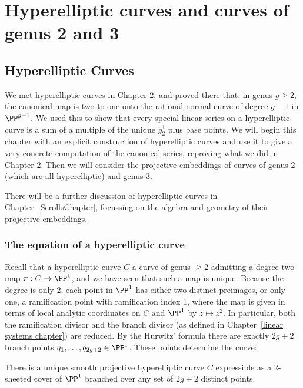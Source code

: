 

\chapter{Hyperelliptic curves and curves of genus 2 and 3}\label{genus 2 and 3 chapter}

\section{Hyperelliptic Curves}\label{hyperelliptic}
 
We met hyperelliptic curves in Chapter 2, and proved there that, in genus $g \geq 2$, the canonical
map is two to one onto the rational normal curve of degree $g-1$ in $\PP^{g-1}$. We used this to show that every special linear series on a hyperelliptic curve is a sum of a multiple of  the 
unique $g^1_2$ plus base points. We will begin this chapter with an explicit construction of hyperelliptic curves and use it to give a very concrete computation of the canonical series, reproving what we did in Chapter 2. Then we will consider the projective embeddings of curves of genus 2 (which are all hyperelliptic) and genus 3.
 
There will be a further discussion of hyperelliptic curves in Chapter~\ref{ScrollsChapter}, focussing on the algebra and geometry of their projective embeddings. 
  
 \subsection{The equation of a hyperelliptic curve}
 
Recall that a hyperelliptic curve $C$ a curve of genus $\geq 2$ admitting a degree two map $\pi : C \to \PP^1$, and we have seen that such a map is unique. Because the degree is only 2, each point in $\PP^1$ has either two distinct preimages, or only one, a ramification point with ramification index 1, where the map is given in terms of local analytic coordinates on $C$ and $\PP^1$ by $z \mapsto z^2$. In particular, both the ramification divisor and the branch divisor (as defined in Chapter~\ref{linear systems chapter}) are reduced. By the Hurwitz' formula there are exactly $2g+2$ branch points $q_1,\dots,q_{2g+2} \in \PP^1$. These points determine the curve:
 
\begin{theorem}\label{hyperelliptic existence}
There is a unique smooth projective hyperelliptic curve $C$ expressible as a 2-sheeted cover of $\PP^1$ branched over any set of $2g+2$ distinct points.
\end{theorem}


